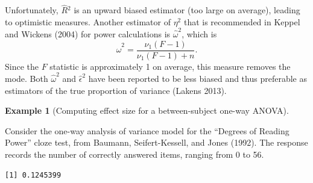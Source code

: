 \documentclass[
  11pt,
  letterpaper,
]{scrbook}
\newenvironment{Shaded}{\begin{snugshade}}{\end{snugshade}}
\newcommand{\AttributeTok}[1]{\textcolor[rgb]{0.40,0.45,0.13}{#1}}
\newcommand{\CommentTok}[1]{\textcolor[rgb]{0.37,0.37,0.37}{#1}}
\newcommand{\DecValTok}[1]{\textcolor[rgb]{0.68,0.00,0.00}{#1}}
\newcommand{\FunctionTok}[1]{\textcolor[rgb]{0.28,0.35,0.67}{#1}}
\newcommand{\NormalTok}[1]{\textcolor[rgb]{0.00,0.23,0.31}{#1}}
\newcommand{\OtherTok}[1]{\textcolor[rgb]{0.00,0.23,0.31}{#1}}
\newcommand{\SpecialCharTok}[1]{\textcolor[rgb]{0.37,0.37,0.37}{#1}}
\newcommand{\StringTok}[1]{\textcolor[rgb]{0.13,0.47,0.30}{#1}}
\theoremstyle{definition}
\newtheorem{example}{Example}[chapter]
\theoremstyle{definition}
\theoremstyle{remark}
\begin{document}
Unfortunately, \(\widehat{R}{}^2\) is an upward biased estimator (too
large on average), leading to optimistic measures. Another estimator of
\(\eta^2\) that is recommended in Keppel and Wickens (2004) for power
calculations is \(\widehat{\omega}^2\), which is
\[\widehat{\omega}^2 = \frac{\nu_1 (F-1)}{\nu_1(F-1)+n}.\] Since the
\(F\) statistic is approximately 1 on average, this measure removes the
mode. Both \(\widehat{\omega}^2\) and \(\widehat{\epsilon}^2\) have been
reported to be less biased and thus preferable as estimators of the true
proportion of variance (Lakens 2013).

\begin{example}[Computing effect size for a between-subject one-way
ANOVA]\protect\hypertarget{exm-calculation-effect-anova}{}\label{exm-calculation-effect-anova}

Consider the one-way analysis of variance model for the ``Degrees of
Reading Power'' cloze test, from Baumann, Seifert-Kessell, and Jones
(1992). The response records the number of correctly answered items,
ranging from 0 to 56.

\begin{Shaded}
\end{Shaded}

\begin{verbatim}
[1] 0.1245399
\end{verbatim}


\end{example}
\end{document}
